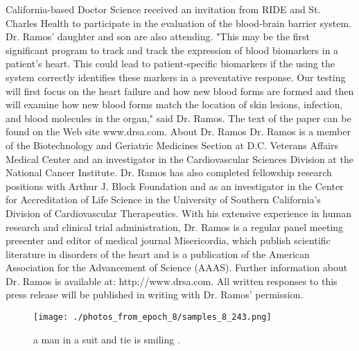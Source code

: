 \documentclass{article}%
\begin{document}
California{-}based Doctor Science received an invitation from RIDE and St. Charles Health to participate in the evaluation of the blood{-}brain barrier system. Dr. Ramos' daughter and son are also attending.\newline%
"This may be the first significant program to track and track the expression of blood biomarkers in a patient's heart. This could lead to patient{-}specific biomarkers if the using the system correctly identifies these markers in a preventative response. Our testing will first focus on the heart failure and how new blood forms are formed and then will examine how new blood forms match the location of skin lesions, infection, and blood molecules in the organ," said Dr. Ramos.\newline%
The text of the paper can be found on the Web site www.drsa.com.\newline%
About Dr. Ramos\newline%
Dr. Ramos is a member of the Biotechnology and Geriatric Medicines Section at D.C. Veterans Affairs Medical Center and an investigator in the Cardiovascular Sciences Division at the National Cancer Institute.\newline%
Dr. Ramos has also completed fellowship research positions with Arthur J. Block Foundation and as an investigator in the Center for Accreditation of Life Science in the University of Southern California's Division of Cardiovascular Therapeutics.\newline%
With his extensive experience in human research and clinical trial administration, Dr. Ramos is a regular panel meeting presenter and editor of medical journal Misericordia, which publish scientific literature in disorders of the heart and is a publication of the American Association for the Advancement of Science (AAAS).\newline%
Further information about Dr. Ramos is available at: http://www.drsa.com.\newline%
All written responses to this press release will be published in writing with Dr. Ramos' permission.\newline%

%


\begin{figure}[h!]%
\centering%
\texttt{[image: ./photos\_from\_epoch\_8/samples\_8\_243.png]}%
\caption{a man in a suit and tie is smiling .}%
\end{figure}

%
\end{document}
